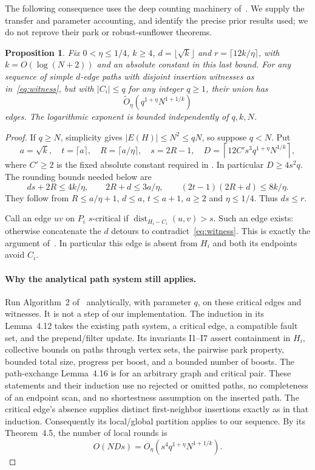 \documentclass[acmsmall,11pt,screen,nonacm]{acmart}
\newcommand{\dist}{\operatorname{dist}}
\newcommand{\Ot}{\widetilde{O}}
\newtheorem{proposition}[theorem]{Proposition}
\begin{document}
The following consequence uses the deep counting machinery of~\cite{PPT26}.
We supply the transfer and parameter accounting, and identify the precise
prior results used; we do not reprove their park or robust-sunflower theorems.

\begin{proposition}\label{prop:packing}
Fix $0<\eta\le1/4$, $k\ge4$, $d=\lfloor\sqrt{k}\rfloor$ and
$r=\lceil12k/\eta\rceil$, with $k=O(\log(N+2))$ and an absolute constant
in this last bound. For any sequence of simple $d$-edge paths with
disjoint insertion witnesses as in~\eqref{eq:witness}, but with
$|C_i|\le q$ for any integer $q\ge1$, their union has
\[
 \Ot_\eta(q^{1+\eta}N^{1+1/k})
\]
edges. The logarithmic exponent is bounded independently of $q,k,N$.
\end{proposition}
\begin{proof}
If $q\ge N$, simplicity gives $|E(H)|\le N^2\le qN$, so suppose $q<N$.
Put
\[
 a=\sqrt{k},\quad t=\lceil a\rceil,\quad
 R=\lceil a/\eta\rceil,\quad s=2R-1,\quad
 D=\left\lceil12C's^3q^{1+\eta}N^{1/k}\right\rceil,
\]
where $C'\ge2$ is the fixed absolute constant required in
\cite[Lemma 5.14]{PPT26}. In particular $D\ge4s^2q$.
The rounding bounds needed below are
\begin{equation}\label{eq:rounding}
 ds+2R\le4k/\eta,\qquad 2R+d\le3a/\eta,\qquad
 (2t-1)(2R+d)\le8k/\eta.
\end{equation}
They follow from $R\le a/\eta+1$, $d\le a$, $t\le a+1$, $a\ge2$ and
$\eta\le1/4$. Thus $ds\le r$.

Call an edge $uv$ on $P_i$ $s$-critical if
$\dist_{H_i-C_i}(u,v)>s$. Such an edge exists: otherwise concatenate
the $d$ detours to contradict~\eqref{eq:witness}. This is exactly the
argument of~\cite[Claim 4.3]{PPT26}. In particular this edge is absent
from $H_i$ and both its endpoints avoid $C_i$.

\paragraph{Why the analytical path system still applies.}
Run Algorithm~2 of~\cite{PPT26} analytically, with parameter $q$, on these
critical edges and witnesses. It is not a step of our implementation.
The induction in its Lemma~4.12 takes the existing path system, a critical
edge, a compatible fault set, and the prepend/filter update. Its invariants
I1--I7 assert containment in $H_i$, collective bounds on paths through
vertex sets, the pairwise park property, bounded total size, progress per
boost, and a bounded number of boosts. The path-exchange Lemma~4.16 is for
an arbitrary graph and critical pair. These statements and their induction
use no rejected or omitted paths, no completeness of an endpoint scan,
and no shortestness assumption on the inserted path. The critical edge's
absence supplies distinct first-neighbor insertions exactly as in that
induction. Consequently its local/global partition applies to our sequence.
By its Theorem~4.5, the number of local rounds is
\begin{equation}\label{eq:local}
 O(NDs)=O_\eta(s^4q^{1+\eta}N^{1+1/k}).
\end{equation}


\end{proof}
\end{document}
